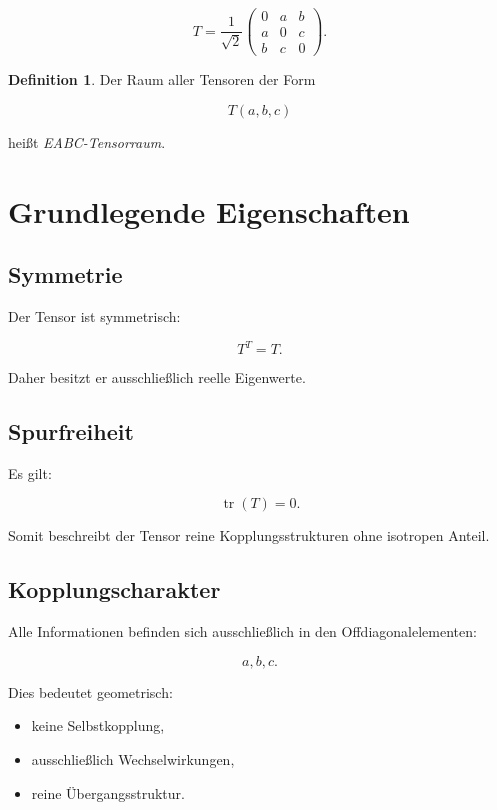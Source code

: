 \documentclass[11pt,a4paper]{article}
\theoremstyle{definition}
\newtheorem{definition}{Definition}
\begin{document}
	\[
	T=
	\frac1{\sqrt2}
	\begin{pmatrix}
		0&a&b\\
		a&0&c\\
		b&c&0
	\end{pmatrix}.
	\]
	
	\begin{definition}
		Der Raum aller Tensoren der Form
		
		\[
		T(a,b,c)
		\]
		
		heißt \emph{EABC-Tensorraum}.
	\end{definition}
	
	\section{Grundlegende Eigenschaften}
	
	\subsection{Symmetrie}
	
	Der Tensor ist symmetrisch:
	
	\[
	T^T=T.
	\]
	
	Daher besitzt er ausschließlich reelle Eigenwerte.
	
	\subsection{Spurfreiheit}
	
	Es gilt:
	
	\[
	\operatorname{tr}(T)=0.
	\]
	
	Somit beschreibt der Tensor reine Kopplungsstrukturen ohne isotropen Anteil.
	
	\subsection{Kopplungscharakter}
	
	Alle Informationen befinden sich ausschließlich in den Offdiagonalelementen:
	
	\[
	a,b,c.
	\]
	
	Dies bedeutet geometrisch:
	
	\begin{itemize}
		\item keine Selbstkopplung,
		\item ausschließlich Wechselwirkungen,
		\item reine Übergangsstruktur.
	\end{itemize}
	
\end{document}
